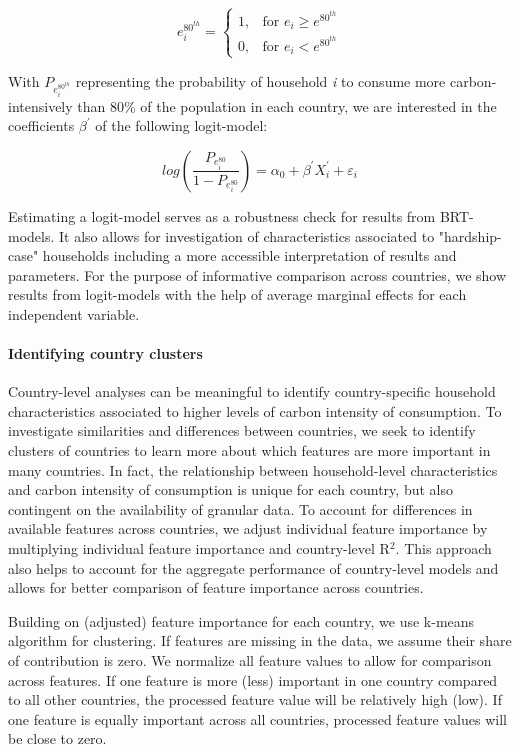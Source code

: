 \documentclass[12pt, a4paper]{article}
\begin{document}
\begin{equation}\label{eq:logit}
    e_{i}^{80^{th}} =
    \begin{cases}
    1, & \text{for }  e_{i} \geq e^{80^{th}} \\
    0, & \text{for }  e_{i} < e^{80^{th}}
    \end{cases}
\end{equation}

With $P_{e_{i}^{80^{th}}}$ representing the probability of household \textit{i} to consume more carbon-intensively than 80\% of the population in each country, we are interested in the coefficients $\beta^{'}$ of the following logit-model:

\begin{equation} \label{logit}
    log \left( \frac{P_{e_{i}^{80}}}{1 - P_{e_{i}^{80}}} \right) = \alpha_{0} + \beta^{'} X_{i}^{'} + \varepsilon_{i}
\end{equation}

Estimating a logit-model serves as a robustness check for results from BRT-models. It also allows for investigation of characteristics associated to "hardship-case" households including a more accessible interpretation of results and parameters. For the purpose of informative comparison across countries, we show results from logit-models with the help of average marginal effects for each independent variable.

\paragraph{Identifying country clusters} Country-level analyses can be meaningful to identify country-specific household characteristics associated to higher levels of carbon intensity of consumption. To investigate similarities and differences between countries, we seek to identify clusters of countries to learn more about which features are more important in many countries. In fact, the relationship between household-level characteristics and carbon intensity of consumption is unique for each country, but also contingent on the availability of granular data. To account for differences in available features across countries, we adjust individual feature importance by multiplying individual feature importance and country-level R$^{2}$. This approach also helps to account for the aggregate performance of country-level models and allows for better comparison of feature importance across countries.

Building on (adjusted) feature importance for each country, we use k-means algorithm for clustering. If features are missing in the data, we assume their share of contribution is zero. We normalize all feature values to allow for comparison across features. If one feature is more (less) important in one country compared to all other countries, the processed feature value will be relatively high (low). If one feature is equally important across all countries, processed feature values will be close to zero.
\end{document}
